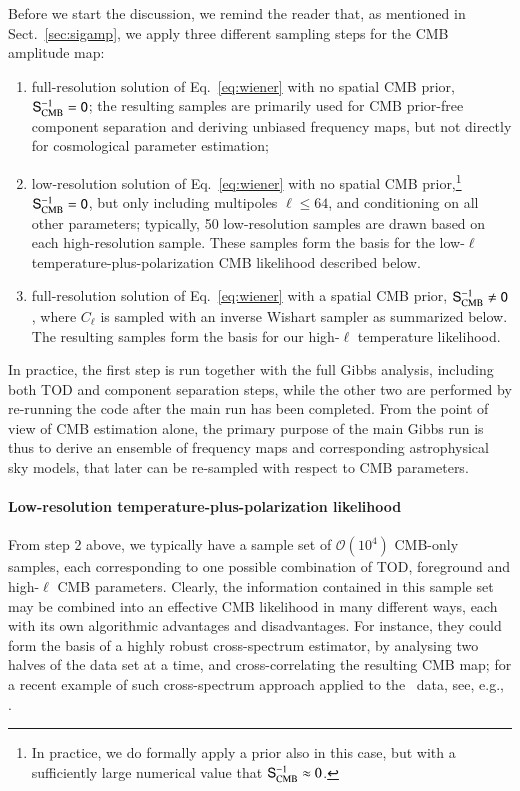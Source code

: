 \documentclass[twocolumn]{aa}
\renewcommand{\S}[0]{\tens{S}}
\begin{document}
Before we start the discussion, we remind the reader that, as
mentioned in Sect.~\ref{sec:sigamp}, we apply three different
sampling steps for the CMB amplitude map:
\begin{enumerate}
\item full-resolution solution of Eq.~\eqref{eq:wiener} with no
  spatial CMB prior, $\S_{\mathrm{CMB}}^{-1} = \tens 0$; the resulting
  samples are primarily used for CMB prior-free component separation
  and deriving unbiased frequency maps, but not directly for
  cosmological parameter estimation;
\item low-resolution solution of Eq.~\eqref{eq:wiener} with no spatial
  CMB prior,\footnote{In practice, we do formally apply a prior also
    in this case, but with a sufficiently large numerical value that
    $\S_{\mathrm{CMB}}^{-1}\approx0$.} $\S_{\mathrm{CMB}}^{-1} = \tens
  0$, but only including multipoles ${\ell \le 64}$, and conditioning
  on all other parameters; typically, 50 low-resolution samples are
  drawn based on each high-resolution sample. These samples form the
  basis for the low-$\ell$ temperature-plus-polarization CMB
  likelihood described below.
\item full-resolution solution of Eq.~\eqref{eq:wiener} with a spatial
  CMB prior, $\S_{\mathrm{CMB}}^{-1} \ne \tens 0$, where $C_{\ell}$ is
  sampled with an inverse Wishart sampler as summarized below. The
  resulting samples form the basis for our high-$\ell$ temperature
  likelihood.
\end{enumerate}
In practice, the first step is run together with the full Gibbs
analysis, including both TOD and component separation steps, while the
other two are performed by re-running the code after the main run has
been completed. From the point of view of CMB estimation alone, the
primary purpose of the main Gibbs run is thus to derive an ensemble of
frequency maps and corresponding astrophysical sky models, that later
can be re-sampled with respect to CMB parameters.

\paragraph{Low-resolution temperature-plus-polarization likelihood}
From step 2 above, we typically have a sample set of
$\mathcal{O}(10^4)$ CMB-only samples, each corresponding to one
possible combination of TOD, foreground and high-$\ell$ CMB
parameters. Clearly, the information contained in this sample set may
be combined into an effective CMB likelihood in many different ways,
each with its own algorithmic advantages and disadvantages. For
instance, they could form the basis of a highly robust cross-spectrum
estimator, by analysing two halves of the data set at a time, and
cross-correlating the resulting CMB map; for a recent example of such
cross-spectrum approach applied to the \Planck\ data, see, e.g.,
\citet{planck2016-l05}.
\end{document}
